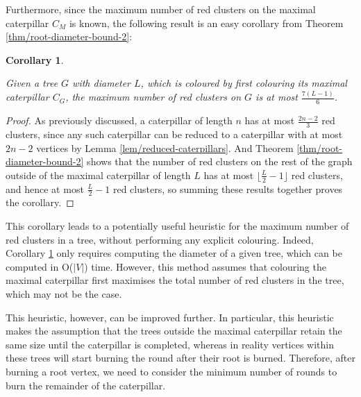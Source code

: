 \documentclass{mpaper}
\newtheorem{corollary}[theorem]{Corollary}
\begin{document}
Furthermore, since the maximum number of red clusters on the maximal caterpillar $C_M$ is known, the following result is an easy corollary from Theorem \ref{thm/root-diameter-bound-2}:

\begin{corollary}
\label{cor/diameter_bound_full}

Given a tree $G$ with diameter $L$, which is coloured by first colouring its maximal caterpillar $C_G$, the maximum number of red clusters on $G$ is at most $\frac{7(L-1)}{6}$.
\end{corollary}

\begin{proof}
  As previously discussed, a caterpillar of length $n$ has at most $\frac{2n-2}{3}$ red clusters, since any such caterpillar can be reduced to a caterpillar with at most $2n-2$ vertices by Lemma \ref{lem/reduced-caterpillars}. And Theorem \ref{thm/root-diameter-bound-2} shows that the number of red clusters on the rest of the graph outside of the maximal caterpillar of length $L$ has at most $\lfloor \frac{L}{2} - 1 \rfloor$ red clusters, and hence at most $\frac{L}{2} - 1$ red clusters, so summing these results together proves the corollary.
\end{proof}

This corollary leads to a potentially useful heuristic for the maximum number of red clusters in a tree, without performing any explicit colouring. Indeed, Corollary \ref{cor/diameter_bound_full} only requires computing the diameter of a given tree, which can be computed in O($|V|$) time. However, this method assumes that colouring the maximal caterpillar first maximises the total number of red clusters in the tree, which may not be the case.

This heuristic, however, can be improved further. In particular, this heuristic makes the assumption that the trees outside the maximal caterpillar retain the same size until the caterpillar is completed, whereas in reality vertices within these trees will start burning the round after their root is burned. Therefore, after burning a root vertex, we need to consider the minimum number of rounds to burn the remainder of the caterpillar.
\end{document}
